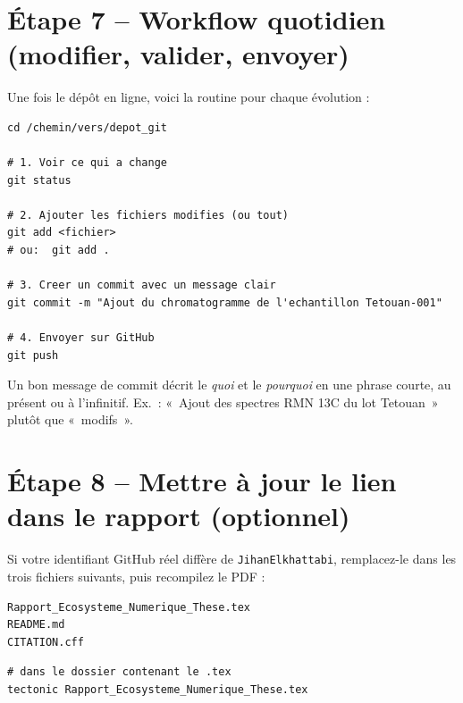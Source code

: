 \documentclass[11pt,a4paper]{article}
\begin{document}
\section{Étape 7 -- Workflow quotidien (modifier, valider, envoyer)}
Une fois le dépôt en ligne, voici la routine pour chaque évolution :

\begin{lstlisting}
cd /chemin/vers/depot_git

# 1. Voir ce qui a change
git status

# 2. Ajouter les fichiers modifies (ou tout)
git add <fichier>
# ou:  git add .

# 3. Creer un commit avec un message clair
git commit -m "Ajout du chromatogramme de l'echantillon Tetouan-001"

# 4. Envoyer sur GitHub
git push
\end{lstlisting}

\begin{astuce}
Un bon message de commit décrit le \emph{quoi} et le \emph{pourquoi} en une phrase
courte, au présent ou à l'infinitif. Ex.~: «~Ajout des spectres RMN 13C du lot
Tetouan~» plutôt que «~modifs~».
\end{astuce}

\section{Étape 8 -- Mettre à jour le lien dans le rapport (optionnel)}
Si votre identifiant GitHub réel diffère de \texttt{JihanElkhattabi}, remplacez-le dans
les trois fichiers suivants, puis recompilez le PDF :
\begin{lstlisting}
Rapport_Ecosysteme_Numerique_These.tex
README.md
CITATION.cff
\end{lstlisting}

\begin{lstlisting}
# dans le dossier contenant le .tex
tectonic Rapport_Ecosysteme_Numerique_These.tex
\end{lstlisting}
\end{document}

